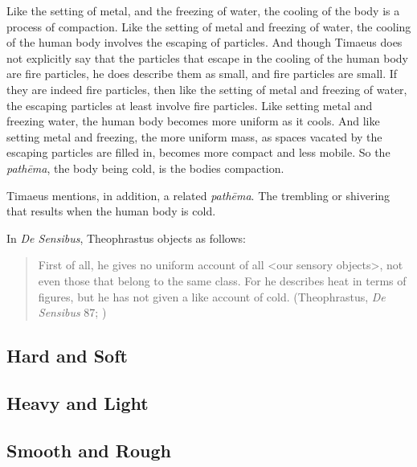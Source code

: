 Like the setting of metal, and the freezing of water, the cooling of the body is a process of compaction. Like the setting of metal and freezing of water, the cooling of the human body involves the escaping of particles. And though Timaeus does not explicitly say that the particles that escape in the cooling of the human body are fire particles, he does describe them as small, and fire particles are small. If they are indeed fire particles, then like the setting of metal and freezing of water, the escaping particles at least involve fire particles. Like setting metal and freezing water, the human body becomes more uniform as it cools. And like setting metal and freezing, the more uniform mass, as spaces vacated by the escaping particles are filled in, becomes more compact and less mobile. So the \emph{pathēma}, the body being cold, is the bodies compaction.

Timaeus mentions, in addition, a related \emph{pathēma}. The trembling or shivering that results when the human body is cold. 

In \emph{De Sensibus}, Theophrastus objects as follows:
\begin{quote}
	First of all, he gives no uniform account of all <our sensory objects>, not even those that belong to the same class. For he describes heat in terms of figures, but he has not given a like account of cold. (Theophrastus, \emph{De Sensibus} 87; \citealt[147]{Stratton:1917vn})
\end{quote}


\subsection{Hard and Soft} %
\label{sub:hard_and_soft}




\subsection{Heavy and Light} %
\label{sub:heavy_and_light}




\subsection{Smooth and Rough} %
\label{sub:smooth_and_rough}




